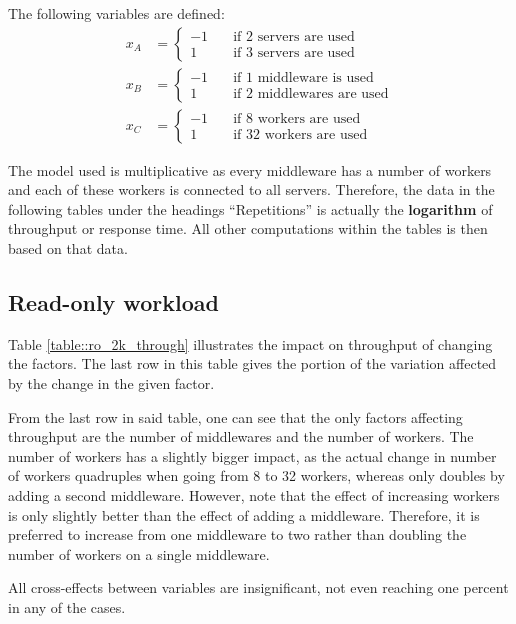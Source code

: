 \documentclass[11pt,a4paper]{article}
\begin{document}
The following variables are defined:
\begin{align}
    x_A &=
    \begin{cases}
        -1 \quad &\text{if 2 servers are used}\\
        1 \quad &\text{if 3 servers are used}
    \end{cases}\label{eq::x_a}\\
    x_B &=
    \begin{cases}
        -1 \quad &\text{if 1 middleware is used}\\
        1 \quad &\text{if 2 middlewares are used}
    \end{cases}\label{eq::x_b}\\
    x_C &=
    \begin{cases}
        -1 \quad &\text{if 8 workers are used}\\
        1 \quad &\text{if 32 workers are used}
    \end{cases}\label{eq::x_c}
\end{align}

The model used is multiplicative as every middleware has a number of workers and each of these workers is connected to all servers. Therefore, the data in the following tables under the headings ``Repetitions'' is actually the \textbf{logarithm} of throughput or response time. All other computations within the tables is then based on that data.

\subsection{Read-only workload}
Table \ref{table::ro_2k_through} illustrates the impact on throughput of changing the factors. The last row in this table gives the portion of the variation affected by the change in the given factor.

From the last row in said table, one can see that the only factors affecting throughput are the number of middlewares and the number of workers. The number of workers has a slightly bigger impact, as the actual change in number of workers quadruples when going from 8 to 32 workers, whereas only doubles by adding a second middleware. However, note that the effect of increasing workers is only slightly better than the effect of adding a middleware. Therefore, it is preferred to increase from one middleware to two rather than doubling the number of workers on a single middleware.

All cross-effects between variables are insignificant, not even reaching one percent in any of the cases.
\end{document}
